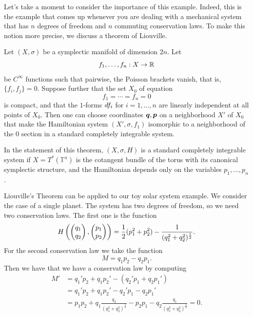 \documentclass[twoside,letterpaper,10pt]{article}
\numberwithin{equation}{section}
\newcommand{\T}{\mathbb{T}}
\begin{document}
Let's take a moment to consider the importance of this example.
Indeed, this is the example that comes up whenever you are dealing with a
mechanical system that has $n$ degrees of freedom and $n$ commuting conservation
laws.
To make this notion more precise, we discuss a theorem of Liouville.
\begin{thm}
  Let $(X, \sigma)$ be a symplectic manifold of dimension $2n$.
  Let
  \begin{equation*}
    f_1, \ldots, f_n : X \to \mathbb{R}
  \end{equation*}
  be $C^{\infty}$ functions such that pairwise, the Poisson brackets vanish,
  that is, $\{f_i, f_j\} = 0$.
  Suppose further that the set $X_0$ of equation
  \begin{equation*}
    f_1 = \cdots = f_n = 0
  \end{equation*}
  is compact, and that the $1$-forms $\mathop{}\!d f_i$ for $i = 1, \ldots, n$ are
  linearly independent at all points of $X_0$.
  Then one can choose coordinates $\bm{q}, \bm{p}$ on a neighborhood $X'$ of
  $X_0$ that make the Hamiltonian system $(X', \sigma, f_1)$ isomorphic to a
  neighborhood of the $0$ section in a standard completely integrable system.
\end{thm}
In the statement of this theorem, $(X, \sigma, H)$ is a standard completely
integrable system if $X = T^*(\T^n)$ is the cotangent bundle of the torus with
its canonical symplectic structure, and the Hamiltonian depends only on the
variables $p_1, \ldots, p_n$.

Liouville's Theorem can be applied to our toy solar system example.
We consider the case of a single planet.
The system has two degrees of freedom, so we need two conservation laws.
The first one is the function
\begin{equation*}
  H \left( \pt{q_1\\q_2}, \pt{p_1\\p_2} \right) = \frac{1}{2}(p_1^2 + p_2^2) -
  \frac{1}{(q_1^2 + q_2^2)^{\frac{1}{2}}}.
\end{equation*}
For the second conservation law we take the function
\begin{equation*}
  M = q_1 p_2 - q_2 p_1.
\end{equation*}
Then we have that we have a conservation law by computing
\begin{align*}
  M' &= q_1' p_2 + q_1 p_2' - \left( q_2' p_1 + q_2 p_1' \right)\\
     &= q_1' p_2 + q_1 p_2' - q_2' p_1 - q_2 p_1'\\
     &= p_1 p_2 + q_1 \frac{q_2}{(q_1^2 + q_2^2)^{\frac{3}{2}}} - p_2 p_1 - q_2
       \frac{q_1}{(q_1^2 + q_2^2)^{\frac{3}{2}}} = 0.
\end{align*}
\end{document}
